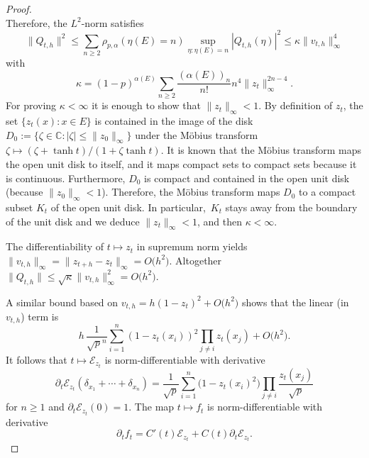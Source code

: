\documentclass[10pt,a4paper]{amsart}
\numberwithin{equation}{section}
\newcommand{\1}{\mathbbm{1}}
\begin{document}
\begin{proof}
\[\]
Therefore, the $L^2$-norm satisfies
\[
	\|Q_{t,h}\|^2 \leq \sum_{n\geq 2} \rho_{p,\alpha}(\eta(E) = n) \sup_{\eta\colon   \eta(E) = n}|Q_{t,h}(\eta)|^2
	 \leq \kappa \|v_{t,h}\|_\infty^4
\]
with
\[
	\kappa = (1-p)^{\alpha(E)} \sum_{n\geq 2} \frac{(\alpha(E))_n}{n!} n^4 \|z_t\|_\infty^{2n-4}.
\]
For proving $\kappa <\infty$ it is enough to show that $\|z_t\|_\infty <1$. By definition of $z_t$, the set $\{z_t(x)\colon {x\in E}\}$ is contained in the image of the disk $D_0:=\{\zeta \in \mathbb C\colon |\zeta|\leq \|z_0\|_\infty\}$ under the M{\"o}bius transform $\zeta \mapsto (\zeta + \tanh t)/(1+ \zeta \tanh t)$. It is known that the M{\"o}bius transform maps the open unit disk to itself, and it maps compact sets to compact sets because it is continuous. Furthermore, $D_0$ is compact and contained in the open unit disk (because $\|z_0\|_\infty <1$). Therefore, the M{\"o}bius transform maps $D_0$ to a compact subset $K_t$ of the open unit disk. In particular,~$K_t$ stays away from the boundary of the unit disk and we deduce $\|z_t\|_\infty <1$, and then $\kappa <\infty$.

The differentiability of $t\mapsto z_t$ in supremum norm yields $\|v_{t,h}\|_\infty = \|z_{t+h} - z_t\|_\infty = O\bigl(h^2\bigr)$. Altogether $\|Q_{t,h}\| \leq \sqrt \kappa \|v_{t,h}\|_\infty^2 =O\bigl(h^2\bigr)$.

 A similar bound based on $v_{t,h} = h (1-z_t)^2 + O\bigl(h^2\bigr)$ shows that the linear (in $v_{t,h}$) term is
\[
	h\, \frac{1}{{\sqrt p}^n}\sum_{i=1}^n (1-z_t(x_i))^2 \prod_{j\neq i} z_t(x_j) + O\bigl(h^2\bigr).
\]
It follows that $t\mapsto \mathcal E_{z_t}$ is norm-differentiable with derivative
\begin{equation} \label{eq:ezdiff}
	\partial_t \mathcal E_{z_t}(\delta_{x_1}+\cdots +\delta_{x_n})
	= \frac{1}{\sqrt p} \sum_{i=1}^n \bigl(1-z_t(x_i)^2\bigr) \prod_{j\neq i } \frac{z_t(x_j)}{\sqrt p}
\end{equation}
for $n\geq 1$ and $\partial_t\mathcal E_{z_t}(0) =1$. The map $t\mapsto f_t$ is norm-differentiable with derivative
\begin{equation}\label{eq:ftdiff}
	\partial_t f_t = C'(t) \mathcal E_{z_t}+ C(t) \partial_t \mathcal E_{z_t}.
\end{equation}


\end{proof}
\end{document}
